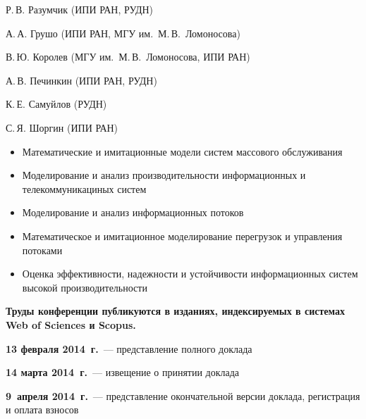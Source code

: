 Р.\,В. Разумчик (ИПИ РАН, РУДН)

\vspace*{12pt}

{\centerline{}}

\vspace*{5pt}

А.\,А. Грушо (ИПИ РАН, МГУ им.\ М.\,В.~Ломоносова)

В.\,Ю. Королев (МГУ им.\ М.\,В.~Ломоносова, ИПИ РАН)

А.\,В. Печинкин (ИПИ РАН, РУДН)

К.\,Е. Самуйлов (РУДН)

С.\,Я. Шоргин (ИПИ РАН)


\vspace*{12pt}

{\centerline{}}
\begin{itemize}
\item  Математические и имитационные модели систем массового обслуживания
\item  Моделирование и анализ производительности информационных и телекоммуникациных систем
\item  Моделирование и анализ информационных потоков
\item Математическое и имитационное моделирование перегрузок и управления потоками 
\item Оценка эффективности, надежности и устойчивости информационных систем высокой производительности
\end{itemize}

\vspace*{7pt}

\textbf{Труды конференции публикуются в изданиях, индексируемых в 
системах Web of Sciences и Scopus.}

\vspace*{14pt}

{\centerline{}}

\vspace*{7pt}

\textbf{13 февраля 2014~г.}~--- представление полного доклада

\textbf{14 марта 2014~г.}~--- извещение о принятии доклада

\textbf{9~апреля 2014~г.}~--- представление окончательной версии доклада, регистрация и оплата взносов
   \thispagestyle{empty}